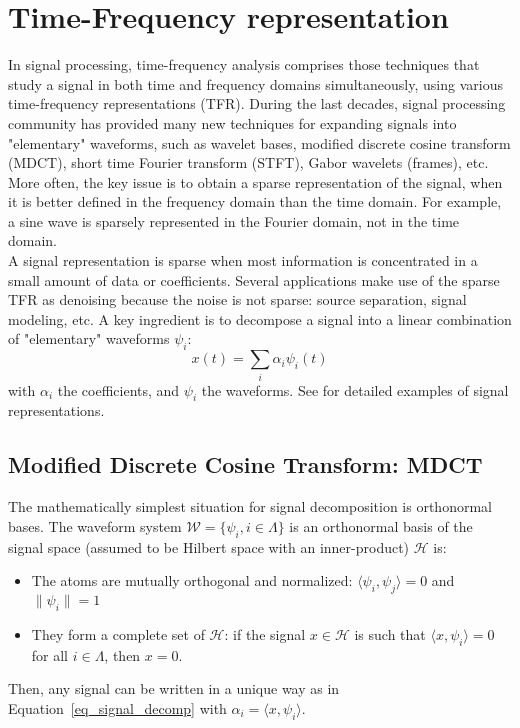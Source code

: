 \section{Time-Frequency representation}
\label{section:TF}
In signal processing, time-frequency analysis comprises those techniques that study a signal in both time and frequency domains simultaneously, using various time-frequency representations (TFR). During the last decades, signal processing community has provided many new techniques for expanding signals into "elementary" waveforms, such as wavelet bases, modified discrete cosine transform (MDCT), short time Fourier transform (STFT), Gabor wavelets (frames), etc. More often, the key issue is to obtain a sparse representation of the signal, when it is better defined in the frequency domain than the time domain. For example, a sine wave is sparsely represented in the Fourier domain, not in the time domain.\\

A signal representation is sparse when most information is concentrated in a small amount of data or coefficients. Several applications make use of the sparse TFR as denoising because the noise is not sparse: source separation, signal modeling, etc. A key ingredient is to decompose a signal into a linear combination of "elementary" waveforms $\psi_{i}$:
\begin{equation}\label{eq_signal_decomp}
x(t) = \sum_i\alpha_i\psi_i(t)
\end{equation}
with $\alpha_i$ the coefficients, and $\psi_i$ the waveforms. See \cite{mallat2008wavelet,hlawatsch1992linear,wickerhauser1994adapted} for detailed examples of signal representations.\\

\subsection{Modified Discrete Cosine Transform: MDCT}
The mathematically simplest situation for signal decomposition is orthonormal bases. The waveform system $\mathcal{W}=\{\psi_i, i \in\Lambda\}$ is an orthonormal basis of the signal space (assumed to be Hilbert space with an inner-product) $\mathcal{H}$ is:
\begin{itemize}
\item The atoms are mutually orthogonal and normalized: $\langle\psi_i,\psi_j\rangle = 0$ and $\|\psi_i\|=1$
\item They form a complete set of $\mathcal{H}$: if the signal $x\in\mathcal{H}$ is such that $\langle x,\psi_i\rangle=0$ for all $i\in\Lambda$, then $x=0$.
\end{itemize}
Then, any signal can be written in a unique way as in Equation~\ref{eq_signal_decomp} with $\alpha_i=\langle x,\psi_i\rangle$.\\

